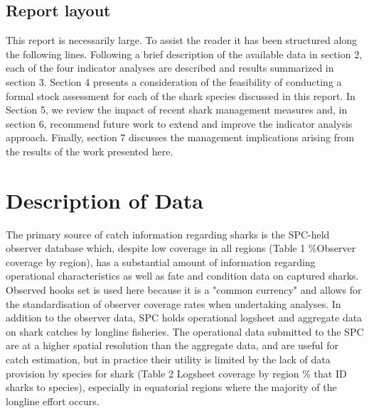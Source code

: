 \documentclass[12pt]{SCreport}
\begin{document}
\subsection{Report layout}
This report is necessarily large. To assist the reader it has been structured along the following lines. Following a brief description of the available data in section 2, each of the four indicator analyses are described and results summarized in section 3. Section 4 presents a consideration of the feasibility of conducting a formal stock assessment for each of the shark species discussed in this report.  In Section 5, we review the impact of recent shark management measures and, in section 6, recommend future work to extend and improve the indicator analysis approach.  Finally, section 7 discusses the management implications arising from the results of the work presented here.

\section{Description of Data}

The primary source of catch information regarding sharks is the SPC-held observer database which, despite low coverage in all regions (Table 1 \%Observer coverage by region), has a substantial amount of information regarding operational characteristics as well as fate and condition data on captured sharks. Observed hooks set is used here because it is a "common currency" and allows for the standardisation of observer coverage rates when undertaking analyses.  In addition to the observer data, SPC holds operational logsheet and aggregate data on shark catches by longline fisheries. The operational data submitted to the SPC are at a higher spatial resolution than the aggregate data, and are useful for catch estimation, but in practice their utility is limited by the lack of data provision by species for shark (Table 2 Logsheet coverage by region \% that ID sharks to species), especially in equatorial regions where the majority of the longline effort occurs.
\end{document}
